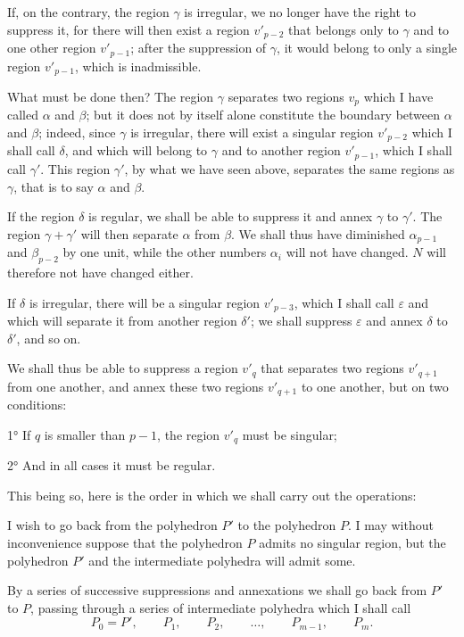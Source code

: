 \documentclass{article}
\begin{document}
If, on the contrary, the region $\gamma$ is irregular, we no longer have the right to suppress it, for there will then exist a region $v'_{p-2}$ that belongs only to $\gamma$ and to one other region $v'_{p-1}$; after the suppression of $\gamma$, it would belong to only a single region $v'_{p-1}$, which is inadmissible.

What must be done then? The region $\gamma$ separates two regions $v_{p}$ which I have called $\alpha$ and $\beta$; but it does not by itself alone constitute the boundary between $\alpha$ and $\beta$; indeed, since $\gamma$ is irregular, there will exist a singular region $v'_{p-2}$
which I shall call $\delta$, and which will belong to $\gamma$ and to another region $v'_{p-1}$, which I shall call $\gamma'$. This region $\gamma'$, by what we have seen above, separates the same regions as $\gamma$, that is to say $\alpha$ and $\beta$.

If the region $\delta$ is regular, we shall be able to suppress it and annex $\gamma$ to $\gamma'$. The region $\gamma + \gamma'$ will then separate $\alpha$ from $\beta$. We shall thus have diminished $\alpha_{p-1}$ and $\beta_{p-2}$ by one unit, while the other numbers $\alpha_{i}$ will not have changed. $N$ will therefore not have changed either.

If $\delta$ is irregular, there will be a singular region $v'_{p-3}$, which I shall call $\varepsilon$ and which will separate it from another region $\delta'$; we shall suppress $\varepsilon$ and annex $\delta$ to $\delta'$, and so on.

We shall thus be able to suppress a region $v'_{q}$ that separates two regions $v'_{q+1}$ from one another, and annex these two regions $v'_{q+1}$ to one another, but on two conditions:

1° If $q$ is smaller than $p - 1$, the region $v'_{q}$ must be singular;

2° And in all cases it must be regular.

This being so, here is the order in which we shall carry out the operations:

I wish to go back from the polyhedron $P'$ to the polyhedron $P$. I may without inconvenience suppose that the polyhedron $P$ admits no singular region, but the polyhedron $P'$ and the intermediate polyhedra will admit some.

By a series of successive suppressions and annexations we shall go back from $P'$ to $P$, passing through a series of intermediate polyhedra which I shall call
\[ P_{0} = P', \qquad P_{1}, \qquad P_{2}, \qquad \ldots, \qquad P_{m-1}, \qquad P_{m}. \]
\end{document}
